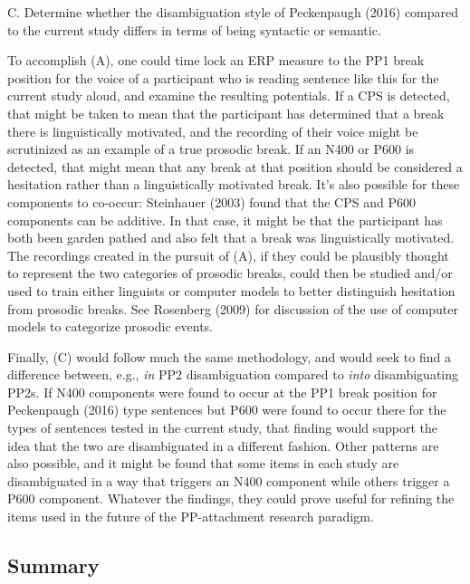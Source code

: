 \documentclass[12pt,oneside]{book}
\begin{document}
C. Determine whether the disambiguation style of Peckenpaugh (2016) compared to the current study differs in terms of being syntactic or semantic.

To accomplish (A), one could time lock an ERP measure to the PP1 break position for the voice of a participant who is reading sentence like this for the current study aloud, and examine the resulting potentials. If a CPS is detected, that might be taken to mean that the participant has determined that a break there is linguistically motivated, and the recording of their voice might be scrutinized as an example of a true prosodic break. If an N400 or P600 is detected, that might mean that any break at that position should be considered a hesitation rather than a linguistically motivated break. It's also possible for these components to co-occur: Steinhauer (2003) found that the CPS and P600 components can be additive. In that case, it might be that the participant has both been garden pathed and also felt that a break was linguistically motivated. The recordings created in the pursuit of (A), if they could be plausibly thought to represent the two categories of prosodic breaks, could then be studied and/or used to train either linguists or computer models to better distinguish hesitation from prosodic breaks. See Rosenberg (2009) for discussion of the use of computer models to categorize prosodic events.

Finally, (C) would follow much the same methodology, and would seek to find a difference between, e.g., \emph{in} PP2 disambiguation compared to \emph{into} disambiguating PP2s. If N400 components were found to occur at the PP1 break position for Peckenpaugh (2016) type sentences but P600 were found to occur there for the types of sentences tested in the current study, that finding would support the idea that the two are disambiguated in a different fashion. Other patterns are also possible, and it might be found that some items in each study are disambiguated in a way that triggers an N400 component while others trigger a P600 component. Whatever the findings, they could prove useful for refining the items used in the future of the PP-attachment research paradigm.

\hypertarget{summary}{%
\subsection{Summary}\label{summary}}
\end{document}
